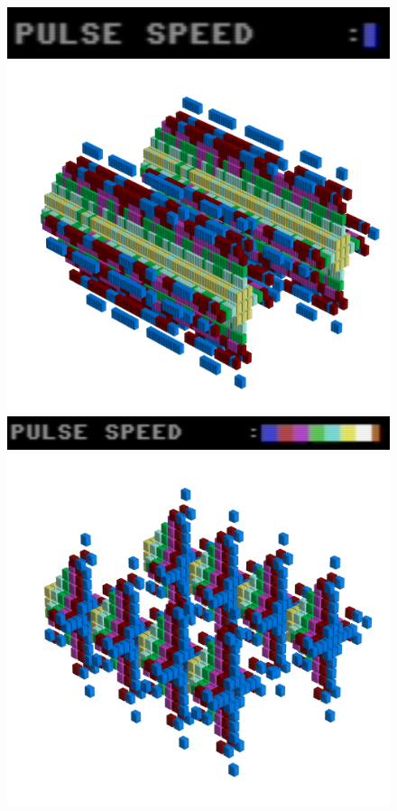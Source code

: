 \begin{figure}[H]
    \centering
    \begin{adjustbox}{width=3cm,margin=11cm -12cm}
      \includegraphics[width=12cm]{src/pulsespeed/pulsespeed-low.png}%
    \end{adjustbox}
    \begin{adjustbox}{width=10.5cm,center}
      \includegraphics[width=12cm]{src/pulsespeed/pattern0-45.png}%
    \end{adjustbox}
    \begin{adjustbox}{width=3cm,margin=11cm -12cm}
      \includegraphics[width=12cm]{src/pulsespeed/pulsespeed-high.png}%
    \end{adjustbox}
    \begin{adjustbox}{width=10.5cm,margin=0cm -2cm}
      \includegraphics[width=12cm]{src/pulsespeed/pattern1-45.png}%

\end{adjustbox}
\end{figure}
